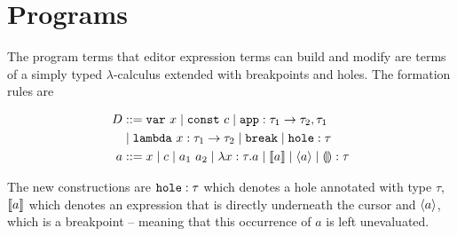 \section{Programs}

The program terms that editor expression terms can build and modify are terms of a simply typed $\lambda$-calculus extended with breakpoints and holes. The formation rules are 

\begin{align}
  D & ::= \texttt{var}~x
  \mid \texttt{const}~c
  \mid \texttt{app} : \tau_1\to\tau_2,\tau_1  \\ \label{eq:lan-mod-aam}
&  \mid \texttt{lambda}~x : \tau_1\to\tau_2 
  \mid \texttt{break}
  \mid \texttt{hole} : \tau \\ 
  a & ::= x
  \mid c
  \mid a_1~a_2
  \mid \lambda x : \tau.a
  \mid \llbracket a \rrbracket
  \mid \langle a \rangle
  \mid \llparenthesis\rrparenthesis : \tau \label{eq:lan-mod-ast}
\end{align}

The new constructions are $\texttt{hole} : \tau$ which denotes a hole annotated with type $\tau$, $\llbracket a \rrbracket$ which denotes an expression that is directly underneath the cursor and $\langle a \rangle$, which is a breakpoint -- meaning that this occurrence of $a$ is left unevaluated.

